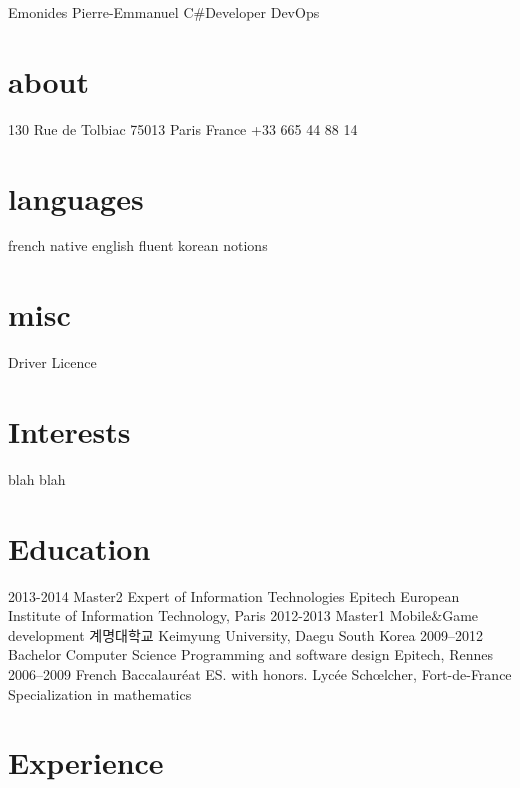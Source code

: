 \documentclass{emonides-cv}
\begin{document}
  
 {Emonides} {Pierre-Emmanuel} {C\#Developer DevOps}

\begin{aside}
  \section{about}
    130 Rue de Tolbiac
    75013 Paris
    France
    +33 665 44 88 14
    ~
  \section{languages}
    french native
    english fluent
    korean notions    
  \section{misc}
    Driver Licence
\end{aside}

\section{Interests}
blah blah

\section{Education}
\begin{entrylist}
  \entry
    {2013-2014}
    {Master2 {\normalfont  Expert of Information Technologies }}
    {Epitech European Institute of Information Technology, Paris} {}
  \entry
    {2012-2013}
    {Master1 {\normalfont  Mobile\&Game development }}
    { 계명대학교 Keimyung University, Daegu South Korea} {}
  \entry
    {2009–2012}
    {Bachelor  {\normalfont Computer Science Programming and software design}}
    {Epitech, Rennes} {}
  \entry
    {2006–2009}
    {French Baccalauréat ES. {\normalfont with honors. }}
    {Lycée Schœlcher, Fort-de-France} { Specialization in mathematics }
\end{entrylist}

\section{Experience}
\end{document}
